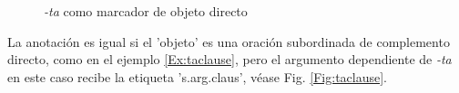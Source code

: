\documentclass[a4paper,11pt,DIV12]{scrartcl}
\begin{document}
\begin{figure}
 \begin{center}
\end{center}
\caption{{\em -ta} como marcador de objeto directo}\label{Fig:taobj}
\end{figure}


La anotaci\'on es igual si el 'objeto' es una oraci\'on subordinada de complemento directo, como en el ejemplo \ref{Ex:taclause}, pero el argumento dependiente de {\em -ta} en este caso recibe la etiqueta 's.arg.claus', v\'ease Fig. \ref{Fig:taclause}.
\end{document}
